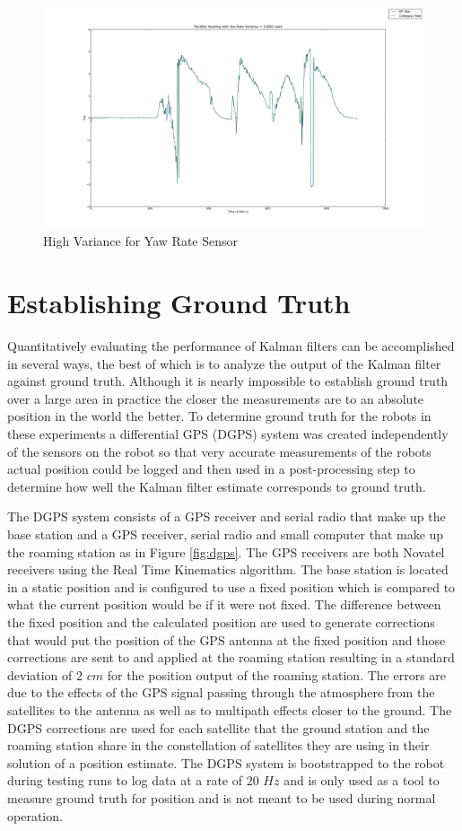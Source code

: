 \begin{figure}[ht!]
	\centering
	\includegraphics[width=.8\textwidth]{images/pbDataHighYRVar}
	\caption{High Variance for Yaw Rate Sensor}
	\label{fig:pbDataHighYRVar}
\end{figure}

\section{Establishing Ground Truth}
\label{sec:groundtruth}
Quantitatively evaluating the performance of Kalman filters can be accomplished in several ways, the best of which is to analyze the output of the Kalman filter against ground truth. Although it is nearly impossible to establish ground truth over a large area in practice the closer the measurements are to an absolute position in the world the better. To determine ground truth for the robots in these experiments a differential GPS (DGPS) system was created independently of the sensors on the robot so that very accurate measurements of the robots actual position could be logged and then used in a post-processing step to determine how well the Kalman filter estimate corresponds to ground truth.

The DGPS system consists of a GPS receiver and serial radio that make up the base station and a GPS receiver, serial radio and small computer that make up the roaming station as in Figure \ref{fig:dgps}. The GPS receivers are both Novatel receivers using the Real Time Kinematics algorithm. The base station is located in a static position and is configured to use a fixed position which is compared to what the current position would be if it were not fixed. The difference between the fixed position and the calculated position are used to generate corrections that would put the position of the GPS antenna at the fixed position and those corrections are sent to and applied at the roaming station resulting in a standard deviation of $2$ $cm$ for the position output of the roaming station. The errors are due to the effects of the GPS signal passing through the atmosphere from the satellites to the antenna as well as to multipath effects closer to the ground. The DGPS corrections are used for each satellite that the ground station and the roaming station share in the constellation of satellites they are using in their solution of a position estimate. The DGPS system is bootstrapped to the robot during testing runs to log data at a rate of $20$ $Hz$ and is only used as a tool to measure ground truth for position and is not meant to be used during normal operation.

